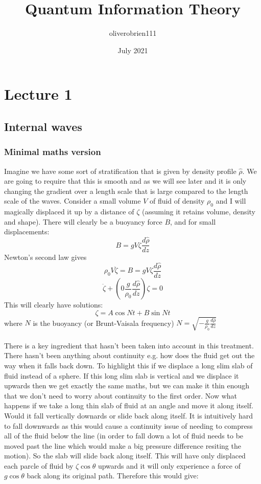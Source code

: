 \documentclass{article}
\title{Quantum Information Theory}
\author{oliverobrien111 }
\date{July 2021}
\begin{document}
\maketitle

\section{Lecture 1}
\subsection{Internal waves}
\subsubsection{Minimal maths version}
Imagine we have some sort of stratification that is given by density profile $\hat \rho$. We are going to require that this is smooth and as we will see later and it is only changing the gradient over a length scale that is large compared to the length scale of the waves. Consider a small volume $V$ of fluid of density $\rho_0$ and I will magically displaced it up by a distance of $\zeta$ (assuming it retains volume, density and shape). There will clearly be a buoyancy force $B$, and for small displacements:
$$
B = g V \zeta \frac{d\hat \rho}{d z}  $$
Newton's second law gives
$$
\rho_0 V \ddot \zeta = B = g V \zeta \frac{d\hat \rho}{d z} 
$$
$$
\ddot \zeta + (0 \frac{g}{\rho_0} \frac{d \hat \rho}{dz} ) \zeta = 0
$$
This will clearly have solutions:
$$
\zeta = A \cos Nt + B \sin Nt
$$
where $N$ is the buoyancy (or Brunt-Vaisala frequency) $N = \sqrt{-\frac{g}{\rho_0} \frac{d\hat \rho}{dz}}$\\\\
There is a key ingredient that hasn't been taken into account in this treatment. There hasn't been anything about continuity e.g. how does the fluid get out the way when it falls back down. To highlight this if we displace a long slim slab of fluid instead of a sphere. If this long slim slab is vertical and we displace it upwards then we get exactly the same maths, but we can make it thin enough that we don't need to worry about continuity to the first order. Now what happens if we take a long thin slab of fluid at an angle and move it along itself. Would it fall vertically downards or slide back along itself. It is intuitively hard to fall downwards as this would cause a continuity issue of needing to compress all of the fluid below the line (in order to fall down a lot of fluid needs to be moved past the line which would make a big pressure difference resiting the motion). So the slab will slide back along itself. This will have only displaced each parcle of fluid by $\zeta \cos \theta$ upwards and it will only experience a force of $g \cos \theta$ back along its original path. Therefore this would give:
\end{document}
